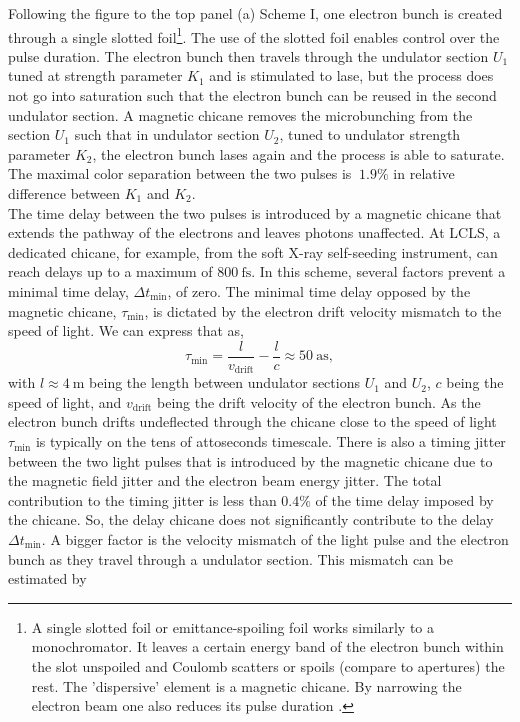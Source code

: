 Following the figure to the top panel (a) Scheme I, one electron bunch is created through a single slotted foil\footnote{A single slotted foil or emittance-spoiling foil works similarly to a monochromator. It leaves a certain energy band of the electron bunch within the slot unspoiled and Coulomb scatters or spoils (compare to apertures) the rest. The 'dispersive' element is a magnetic chicane. By narrowing the electron beam one also reduces its pulse duration \cite{Emma-2004-PRL}.}. The use of the slotted foil enables control over the pulse duration. The electron bunch then travels through the undulator section $U_{1}$ tuned at strength parameter $K_{1}$ and is stimulated to lase, but the process does not go into saturation such that the electron bunch can be reused in the second undulator section. A magnetic chicane removes the microbunching from the section $U_{1}$ such that in undulator section $U_{2}$, tuned to undulator strength parameter $K_{2}$, the electron bunch lases again and the process is able to saturate. The maximal color separation between the two pulses is $~ 1.9\%$ in relative difference between $K_{1}$ and $K_{2}$.\\[1\baselineskip]
%
The time delay between the two pulses is introduced by a magnetic chicane that extends the pathway of the electrons and leaves photons unaffected. At LCLS, a dedicated chicane, for example, from the soft X-ray self-seeding instrument, can reach delays up to a maximum of $\SI{800}{\femto\second}$.
In this scheme, several factors prevent a minimal time delay, $\Delta t_{\text{min}}$, of zero. The minimal time delay opposed by the magnetic chicane, $\tau_{\text{min}}$, is dictated by the electron drift velocity mismatch to the speed of light. We can express that as,
\begin{equation}
\tau_{\text{min}} = \frac{l}{v_{\text{drift}}} - \frac{l}{c}\approx \SI{50}{\atto\second},
\label{eq:alberto-delta-t-min}
\end{equation}
with $l\approx \SI{4}{\meter}$ being the length between undulator sections $U_{1}$ and $U_{2}$, $c$ being the speed of light, and $v_{\text{drift}}$ being the drift velocity of the electron bunch. As the electron bunch drifts undeflected through the chicane close to the speed of light $\tau_{\text{min}}$ is typically on the tens of attoseconds timescale.
There is also a timing jitter between the two light pulses that is introduced by the magnetic chicane due to the magnetic field jitter and the electron beam energy jitter. The total contribution to the timing jitter is less than $0.4\%$ of the time delay imposed by the chicane. So, the delay chicane does not significantly contribute to the delay $\Delta t_{\text{min}}$. A bigger factor is the velocity mismatch of the light pulse and the electron bunch as they travel through a undulator section. This mismatch can be estimated by
